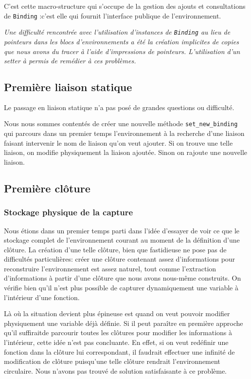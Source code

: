 \documentclass[a4paper,11pt]{article}
\newcommand{\dbend}{{\manual\char127}}
\newenvironment{attention}%
{\description\item[\dbend]\sl}%
{\enddescription}
\begin{document}
C'est cette macro-structure qui s'occupe de la gestion des ajouts et
consultations de \texttt{Binding} :c'est elle qui fournit l'interface publique
de l'environnement.

\begin{attention}
  Une difficulté rencontrée avec l'utilisation d'instances de \texttt{Binding}
  au lieu de pointeurs dans les blocs d'environnements a été la création
  implicites de copies que nous avons du tracer à l'aide d'impressions de
  pointeurs. L'utilisation d'un setter à permis de remédier à ces problèmes.
\end{attention}

\subsection{Première liaison statique}

Le passage en liaison statique n'a pas posé de grandes questions ou difficulté.

Nous nous sommes contentés de créer une nouvelle méthode
\texttt{set\_new\_binding} qui parcours dans un premier temps l'environnement à la
recherche d'une liaison faisant intervenir le nom de liaison qu'on veut ajouter.
Si on trouve une telle liaison, on modifie physiquement la liaison ajoutée.
Sinon on rajoute une nouvelle liaison.

\subsection{Première clôture}

\subsubsection{Stockage physique de la capture}

Nous étions dans un
premier temps parti dans l'idée d'essayer de voir ce que le stockage complet de
l'environnement courant au moment de la définition d'une clôture. La création
d'une telle clôture, bien que fastidieuse ne pose pas de difficultés
particulières: créer une clôture contenant assez d'informations pour
reconstruire l'environnement est assez naturel, tout comme l'extraction
d'informations à partir d'une clôture que nous avons nous-même construits.
On vérifie bien qu'il n'est plus possible de capturer dynamiquement une variable à l'intérieur
d'une fonction.

Là où la situation devient plus épineuse est quand on veut pouvoir modifier
physiquement une variable déjà définie. Si il peut paraître en première approche
qu'il \og suffirait\fg de parcourir toutes les clôtures pour modifier les
informations à l'intérieur, cette idée n'est pas concluante. En effet, si on
veut redéfinir une fonction dans la clôture lui correspondant, il faudrait
effectuer une infinité de modification de clôture puisqu'une telle clôture
rendrait l'environnement circulaire. Nous n'avons pas trouvé de solution
satisfaisante à ce problème.
\end{document}
